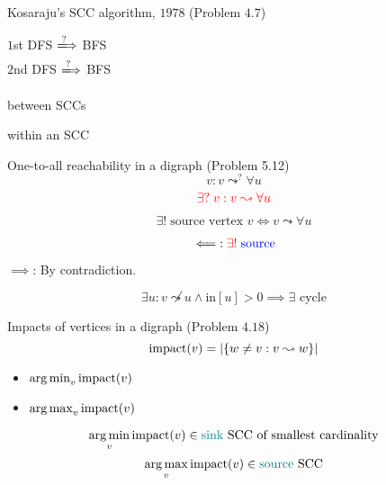 \begin{frame}{}
  \begin{exampleblock}{Kosaraju's SCC algorithm, $1978$ (Problem $4.7$)}
    \begin{center}
      $1$st DFS $\xLongrightarrow{?}$ BFS \\[8pt]
      $2$nd DFS $\xLongrightarrow{?}$ BFS
    \end{center}
  \end{exampleblock}

  \pause
  \vspace{0.50cm}
  \begin{description}
    \centering
    \item[$1$st DFS:]  between SCCs
    \item[$2$nd DFS:]  within an SCC
  \end{description}

  \pause
  \vspace{0.50cm}
  \centerline{}
\end{frame}
\begin{frame}{}
  \begin{exampleblock}{One-to-all reachability in a digraph (Problem 5.12)}
    \[
      v: v \leadsto^{?} \forall u
    \]
    \[
      \textcolor{red}{\exists?\; v: v \leadsto \forall u}
    \]
  \end{exampleblock}

  \pause
  \vspace{0.60cm}
  \centerline{}

  \[
    \exists!\; \text{source vertex } v \iff v \leadsto \forall u
  \]

  \pause
  \[
    \impliedby: \textcolor{red}{\exists!}\; \textcolor{blue}{\text{source}}
  \]

  \pause
  \centerline{$\implies$: By contradiction.}
  \[
    \exists u: v \not\leadsto u \land \text{in}[u] > 0 \implies \exists \text{ cycle}
  \]
\end{frame}
\begin{frame}{}
  \begin{exampleblock}{Impacts of vertices in a digraph (Problem $4.18$)}
    \[
      \text{impact}(v) = |\{w \neq v: v \leadsto w\}|
    \]

    \begin{itemize}
      \centering
      \item $\operatorname*{arg\,min}_{v} \text{impact}(v)$
      \item $\operatorname*{arg\,max}_{v} \text{impact}(v)$
    \end{itemize}
  \end{exampleblock}

  \pause
  \[
    \operatorname*{arg\,min}_{v} \text{impact}(v) \in \text{\textcolor{teal}{sink} SCC of smallest cardinality}
  \]
  \pause
  \[
    \operatorname*{arg\,max}_{v} \text{impact}(v) \in \text{\textcolor{teal}{source} SCC}
  \]

  \pause
  \vspace{0.30cm}
  \centerline{}
\end{frame}

